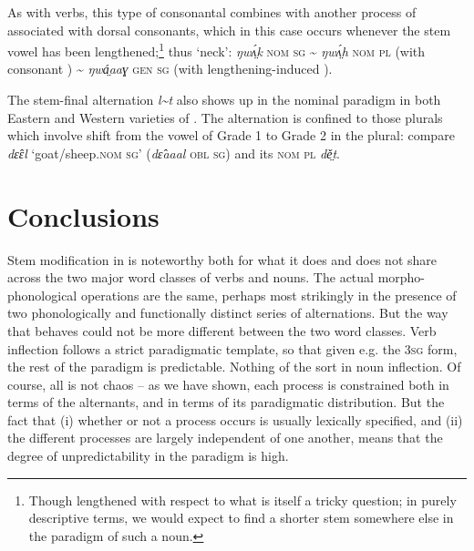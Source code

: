 \documentclass[output=paper,newtxmath,modfonts,nonflat,draftmode]{langsci/langscibook}
\begin{document}
As with verbs, this type of consonantal  combines with another process of  associated with dorsal consonants, which in this case occurs whenever the stem vowel has been lengthened;\footnote{Though\label{fn:monich:18} lengthened with respect to what is itself a tricky question; in purely descriptive terms, we would expect to find a shorter stem somewhere else in the paradigm of such a noun.} thus ‘neck’: \textit{ŋwʌ̤́k} \textsc{nom sg} {\textasciitilde} \textit{ŋwʌ̤́h} \textsc{nom pl} (with consonant ) {\textasciitilde} \textit{ŋwá̤aaɣ} \textsc{gen sg} (with lengthening-induced ).

The stem-final alternation \textit{l{\textasciitilde}t} also shows up in the nominal paradigm in both Eastern and Western varieties of . The alternation is confined to those plurals which involve shift from the vowel of Grade 1 to Grade 2 in the plural:  compare \textit{dɛ̂ɛl} ‘goat/sheep.\textsc{nom sg}’ (\textit{dɛ̂aaal} \textsc{obl sg}) and its \textsc{nom pl} \textit{dě̤t}.

\section{Conclusions} %
\label{sec:monich:6}

Stem modification in  is noteworthy both for what it does and does not share across the two major word classes of verbs and nouns. The actual morpho-phonological operations are the same, perhaps most strikingly in the presence of two phonologically and functionally distinct series of  alternations. But the way that  behaves could not be more different between the two word classes. Verb inflection follows a strict paradigmatic template, so that given e.g. the 3\textsc{sg} form, the rest of the paradigm is predictable. Nothing of the sort in noun inflection. Of course, all is not chaos – as we have shown, each  process is constrained both in terms of the alternants, and in terms of its paradigmatic distribution. But the fact that (i) whether or not a  process occurs is usually lexically specified, and (ii) the different  processes are largely independent of one another, means that the degree of unpredictability in the paradigm is high.
\end{document}
